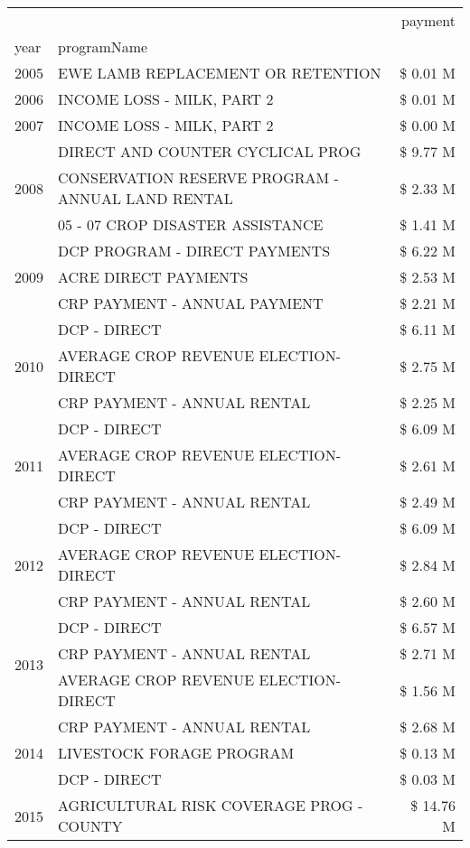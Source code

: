 \begin{tabular}{llr}
\toprule
 &  & payment \\
year & programName &  \\
\midrule
2005 & EWE LAMB REPLACEMENT OR RETENTION & \$ 0.01 M \\
\cline{1-3}
2006 & INCOME LOSS - MILK, PART 2 & \$ 0.01 M \\
\cline{1-3}
2007 & INCOME LOSS - MILK, PART 2 & \$ 0.00 M \\
\cline{1-3}
\multirow[t]{3}{*}{2008} & DIRECT AND COUNTER CYCLICAL PROG & \$ 9.77 M \\
 & CONSERVATION RESERVE PROGRAM - ANNUAL LAND RENTAL & \$ 2.33 M \\
 & 05 - 07 CROP DISASTER ASSISTANCE & \$ 1.41 M \\
\cline{1-3}
\multirow[t]{3}{*}{2009} & DCP PROGRAM - DIRECT PAYMENTS & \$ 6.22 M \\
 & ACRE DIRECT PAYMENTS & \$ 2.53 M \\
 & CRP PAYMENT - ANNUAL PAYMENT & \$ 2.21 M \\
\cline{1-3}
\multirow[t]{3}{*}{2010} & DCP - DIRECT & \$ 6.11 M \\
 & AVERAGE CROP REVENUE ELECTION-DIRECT & \$ 2.75 M \\
 & CRP PAYMENT - ANNUAL RENTAL & \$ 2.25 M \\
\cline{1-3}
\multirow[t]{3}{*}{2011} & DCP - DIRECT & \$ 6.09 M \\
 & AVERAGE CROP REVENUE ELECTION-DIRECT & \$ 2.61 M \\
 & CRP PAYMENT - ANNUAL RENTAL & \$ 2.49 M \\
\cline{1-3}
\multirow[t]{3}{*}{2012} & DCP - DIRECT & \$ 6.09 M \\
 & AVERAGE CROP REVENUE ELECTION-DIRECT & \$ 2.84 M \\
 & CRP PAYMENT - ANNUAL RENTAL & \$ 2.60 M \\
\cline{1-3}
\multirow[t]{3}{*}{2013} & DCP - DIRECT & \$ 6.57 M \\
 & CRP PAYMENT - ANNUAL RENTAL & \$ 2.71 M \\
 & AVERAGE CROP REVENUE ELECTION-DIRECT & \$ 1.56 M \\
\cline{1-3}
\multirow[t]{3}{*}{2014} & CRP PAYMENT - ANNUAL RENTAL & \$ 2.68 M \\
 & LIVESTOCK FORAGE PROGRAM & \$ 0.13 M \\
 & DCP - DIRECT & \$ 0.03 M \\
\cline{1-3}
\multirow[t]{3}{*}{2015} & AGRICULTURAL RISK COVERAGE PROG - COUNTY & \$ 14.76 M \\

\end{tabular}

